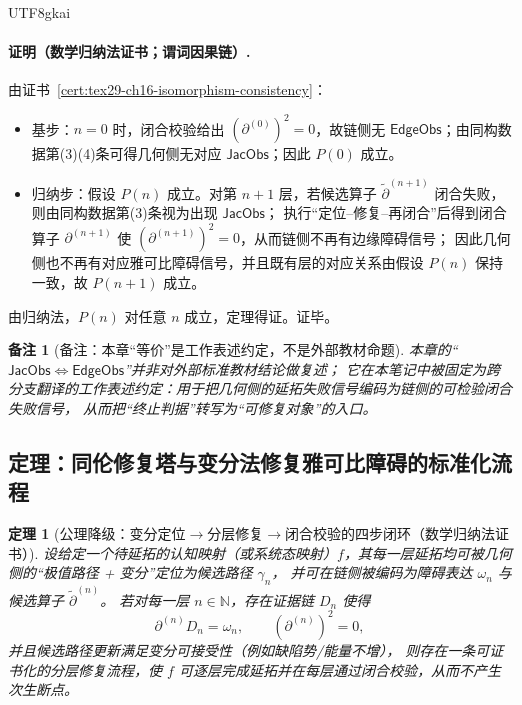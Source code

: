 \documentclass[12pt]{article}
\newtheorem{theorem}{定理}[section]
\newtheorem{remark}{备注}[section]
\newcommand{\NN}{\mathbb{N}}
\newcommand{\KouJing}{\texorpdfstring{表述约定}{表述约定}}
\begin{document}
\begin{CJK*}{UTF8}{gkai}
\paragraph{证明（数学归纳法证书；谓词因果链）.}
由证书~\ref{cert:tex29-ch16-isomorphism-consistency}：
\begin{itemize}
  \item 基步：$n=0$ 时，闭合校验给出 $(\partial^{(0)})^2=0$，故链侧无 $\mathsf{EdgeObs}$；由同构数据第(3)(4)条可得几何侧无对应 $\mathsf{JacObs}$；因此 $P(0)
    $ 成立。
  \item 归纳步：假设 $P(n)$ 成立。对第 $n+1$ 层，若候选算子 $\widetilde{\partial}^{(n+1)}$ 闭合失败，则由同构数据第(3)条视为出现 $\mathsf{JacObs}$；
  执行“定位--修复--再闭合”后得到闭合算子 $\partial^{(n+1)}$ 使 $(\partial^{(n+1)})^2=0$，从而链侧不再有边缘障碍信号；
  因此几何侧也不再有对应雅可比障碍信号，并且既有层的对应关系由假设 $P(n)$ 保持一致，故 $P(n+1)$ 成立。
\end{itemize}
由归纳法，$P(n)$ 对任意 $n$ 成立，定理得证。证毕。

\begin{remark}[备注：本章“等价”是工作\KouJing，不是外部教材命题]
本章的“$\mathsf{JacObs}\Leftrightarrow \mathsf{EdgeObs}$”并非对外部标准教材结论做复述；
它在本笔记中被固定为\emph{跨分支翻译的工作\KouJing}：用于把几何侧的延拓失败信号编码为链侧的可检验闭合失败信号，
从而把“终止判据”转写为“可修复对象”的入口。
\end{remark}

\subsection{定理：同伦修复塔与变分法修复雅可比障碍的标准化流程}
\label{subsec:tex29-ch16-variational-tower}

\begin{theorem}[公理降级：变分定位\texorpdfstring{$\to$}{->}分层修复\texorpdfstring{$\to$}{->}闭合校验的四步闭环（数学归纳法证书）]
\label{thm:tex29-ch16-variational-tower}
设给定一个待延拓的认知映射（或系统态映射）$f$，其每一层延拓均可被几何侧的“极值路径 + 变分”定位为候选路径 $\gamma_n$，
并可在链侧被编码为障碍表达 $\omega_n$ 与候选算子 $\widetilde{\partial}^{(n)}$。
若对每一层 $n\in\NN$，存在证据链 $D_n$ 使得
\[
  \partial^{(n)} D_n=\omega_n,
  \qquad
  (\partial^{(n)})^2=0,
\]
并且候选路径更新满足变分可接受性（例如缺陷势/能量不增），
则存在一条可证书化的分层修复流程，使 $f$ 可逐层完成延拓并在每层通过闭合校验，从而不产生次生断点。
\end{theorem}


\end{CJK*}
\end{document}
